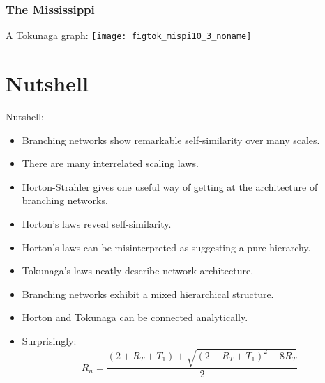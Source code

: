 \begin{frame}[label=]
  \frametitle{The Mississippi}

  \begin{block}{A Tokunaga graph:}
    \texttt{[image: figtok\_mispi10\_3\_noname]}
  \end{block}

\end{frame}

\section{Nutshell}

\begin{frame}[label=]
  \small

  \begin{block}{Nutshell:}
    \begin{itemize}
    \item<+->
      Branching networks show remarkable \alert{self-similarity} over many scales.
    \item<+->
      There are many interrelated scaling laws.
    \item<+->
      Horton-Strahler  gives one useful way of 
      getting at the architecture of branching networks.
    \item<+->
      \alert{Horton's laws} reveal self-similarity.
    \item<+->
      Horton's laws can be misinterpreted as
      suggesting a pure hierarchy.
    \item<+->
      \alert{Tokunaga's laws} neatly describe network architecture.
    \item<+->
      Branching networks exhibit a mixed hierarchical structure.
    \item<+->
      Horton and Tokunaga can be connected analytically.
    \item<+->
      Surprisingly: 
      $$
      R_n
      =
      \frac{
        (2+R_T+T_1)
        +
        \sqrt{
          (2+R_T+T_1)^2-8R_T
        }
      }
      {2}
      $$
    \end{itemize}
  \end{block}

\end{frame}


